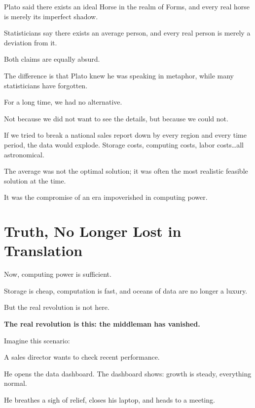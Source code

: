 \vspace{1em}
Plato said there exists an ideal Horse in the realm of Forms, and every real horse is merely its imperfect shadow.

Statisticians say there exists an average person, and every real person is merely a deviation from it.

Both claims are equally absurd.

The difference is that Plato knew he was speaking in metaphor, while many statisticians have forgotten.

For a long time, we had no alternative.

\vspace{1em}

Not because we did not want to see the details, but because we could not.

If we tried to break a national sales report down by every region and every time period, the data would explode. Storage costs, computing costs, labor costs\ldots all astronomical.

The average was not the optimal solution; it was often the most realistic feasible solution at the time.

It was the compromise of an era impoverished in computing power.

\newpage
\section{Truth, No Longer Lost in Translation}

Now, computing power is sufficient.

Storage is cheap, computation is fast, and oceans of data are no longer a luxury.

But the real revolution is not here.

\begin{importantbox}
    \textbf{The real revolution is this: the middleman has vanished.}
\end{importantbox}

\vspace{1em}

Imagine this scenario:

A sales director wants to check recent performance.

He opens the data dashboard. The dashboard shows: growth is steady, everything normal.

He breathes a sigh of relief, closes his laptop, and heads to a meeting.

\vspace{1em}

